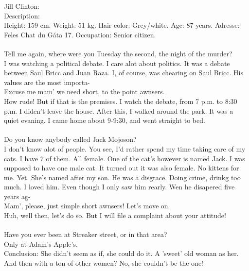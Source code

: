 \documentclass[]{article}
\begin{document}
Jill Clinton: \\
Description: \\ Height: 159 cm. Weight: 51 kg. Hair color: Grey/white. Age: 87 years. Adresse: Feles Chat du Gáta 17.  Occupation: Senior citizen.
\\ \\
Tell me again, where were you Tuesday the second, the night of the murder? \\
I was watching a political debate. I care alot about politics. It was a debate between Saul Bricc and Juan Raza. I, of course, was chearing on Saul Bricc. His values are the most importa- \\
Excuse me mam' we need short, to the point awnsers. \\
How rude! But if that is the premises. I watch the debate, from 7 p.m. to 8:30 p.m. I diden't leave the house. After this, I walked around the park. It was a quiet evaning. I came home about 9-9:30, and went straight to bed.
\\ \\
Do you know anybody called Jack Mojoson? \\
I don't know alot of people. You see, I'd rather spend my time taking care of my cats. I have 7 of them. All female. One of the cat's however is named Jack. I was supposed to have one male cat. It turned out it was also female. No kittens for me. Yet. She's named after my son. He was a disgrace. Doing crime, drinkg too much. I loved him. Even though I only saw him rearly. Wen he disapered five years ag- \\
Mam', please, just simple short awnsers! Let's move on. \\
Huh, well then, let's do so. But I will file a complaint about your attitude!
\\ \\
Have you ever been at Streaker street, or in that area? \\
Only at Adam's Apple's. 
\\
Conclusion: She didn't seem as if, she could do it. A 'sweet' old woman as her. And then with a ton of other women? No, she couldn't be the one!
\\ \\
\end{document}
